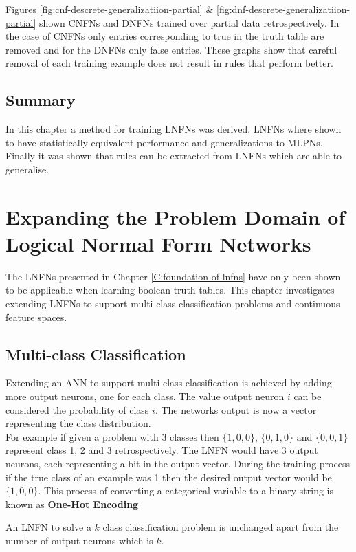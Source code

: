 Figures \ref{fig:cnf-descrete-generalizatiion-partial} \& \ref{fig:dnf-descrete-generalizatiion-partial} shown CNFNs and DNFNs trained over partial data retrospectively. In the case of CNFNs only entries corresponding to true in the truth table are removed and for the DNFNs only false entries. These graphs show that careful removal of each training example does not result in rules that perform better.

\section{Summary}
In this chapter a method for training LNFNs was derived. LNFNs where shown to have statistically equivalent performance and generalizations to MLPNs. Finally it was shown that rules can be extracted from LNFNs which are able to generalise.

\chapter{Expanding the Problem Domain of Logical Normal Form Networks} \label{C:investigation-of-lnfns}
The LNFNs presented in Chapter \ref{C:foundation-of-lnfns} have only been shown to be applicable when learning boolean truth tables. This chapter investigates extending LNFNs to support multi class classification problems and continuous feature spaces.

\section{Multi-class Classification}
Extending an ANN to support multi class classification is achieved by adding more output neurons, one for each class. The value output neuron $i$ can be considered the probability of class $i$. The networks output is now a vector representing the class distribution. \\

For example if given a problem with 3 classes then $\{1,0,0\}$, $\{0,1,0\}$ and $\{0,0,1\}$ represent class 1, 2 and 3 retrospectively. The LNFN would have 3 output neurons, each representing a bit in the output vector. During the training process if the true class of an example was 1 then the desired output vector would be $\{1,0,0\}$. This process of converting a categorical variable to a binary string is known as \textbf{One-Hot Encoding}

\begin{definition}
	An LNFN to solve a $k$ class classification problem is unchanged apart from the number of output neurons which is $k$.
\end{definition}

